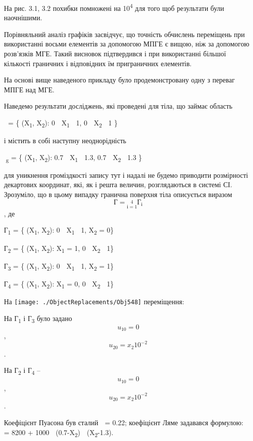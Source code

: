 На рис. 3.1, 3.2 похибки помножені на 10\textsuperscript{4} для того щоб
результати були наочнішими.

Порівняльний аналіз графіків засвідчує, що точність обчислень переміщень
при використанні восьми елементів за допомогою МПГЕ є вищою, ніж за
допомогою розв'язків МГЕ. Такий висновок підтвердився і при використанні
більшої кількості граничних і відповідних їм приграничних елементів.

На основі вище наведеного прикладу було продемонстровану одну з переваг
МПГЕ над МГЕ.

Наведемо результати досліджень, які проведені для тіла, що займає
область

 = \{ (X\textsubscript{1}, X\textsubscript{2}): 0  X\textsubscript{1
} 1, 0  X\textsubscript{2 } 1 \}

і містить в собі наступну неоднорідність

\textsubscript{g} = \{ (X\textsubscript{1}, X\textsubscript{2}): 0.7 
X\textsubscript{1 } 1.3, 0.7  X\textsubscript{2 } 1.3 \}

для уникнення громіздкості запису тут і надалі не будемо приводити
розмірності декартових координат, які, як і решта величин, розглядаються
в системі СІ. Зрозуміло, що в цьому випадку гранична поверхня тіла
описується виразом \[{{Г = \underset{і = 1}{\overset{4}{}}}Г_{і}}{}\],
де

Г\textsubscript{1} = \{ (X\textsubscript{1}, X\textsubscript{2­}): 0 
X\textsubscript{1 } 1, X\textsubscript{2} = 0\}

Г\textsubscript{2} = \{ (X\textsubscript{1}, X\textsubscript{2­}):
X\textsubscript{1 }= 1, 0  X\textsubscript{2 } 1\}

Г\textsubscript{3} = \{ (X\textsubscript{1}, X\textsubscript{2­}): 0 
X\textsubscript{1 } 1, X\textsubscript{2} = 1\}

Г\textsubscript{4} = \{ (X\textsubscript{1}, X\textsubscript{2­}):
X\textsubscript{1 }= 0, 0  X\textsubscript{2 } 1\}

На
\texttt{[image: ./ObjectReplacements/Obj548]}
переміщення:

На Г\textsubscript{1} і Г\textsubscript{3} було задано
\[{u_{\text{10}} = 0}{}\],
\[{{u_{\text{20}} = x_{2}}\text{10}^{- 2}}{}\].

На Г\textsubscript{2} і Г\textsubscript{4 } --\[{u_{\text{10}} = 0}{}\],
\[{{u_{\text{20}} = x_{2}}\text{10}^{- 2}}{}\].

Коефіцієнт Пуасона був сталий  = 0.22; коефіцієнт Ляме задавався
формулою:  = 8200 + 1000  (0.7-X\textsubscript{2}) 
(X\textsubscript{2}-1.3).

